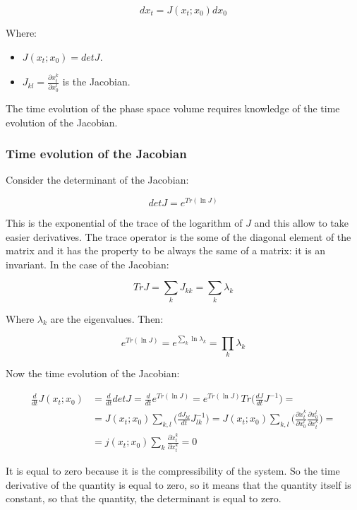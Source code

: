 	$$dx_t = J(x_t;x_0)dx_0$$

	Where:

	\begin{multicols}{2}
		\begin{itemize}
			\item $J(x_t;x_0) = det J$.
			\item $J_{kl} = \frac{\partial x_t^k}{\partial x_0^l}$ is the Jacobian.
		\end{itemize}
	\end{multicols}

	The time evolution of the phase space volume requires knowledge of the time evolution of the Jacobian.

		\subsubsection{Time evolution of the Jacobian}
		Consider the determinant of the Jacobian:

		$$det J = e^{Tr(\ln J)}$$

		This is the exponential of the trace of the logarithm of $J$ and this allow to take easier derivatives.
		The trace operator is the some of the diagonal element of the matrix and it has the property to be always the same of a matrix: it is an invariant.
		In the case of the Jacobian:

		$$Tr J = \sum\limits_k J_{kk} = \sum\limits_k\lambda_k$$

		Where $\lambda_k$ are the eigenvalues.
		Then:

		$$e^{Tr(\ln J)} = e^{\sum\limits_k\ln\lambda_k} = \prod\limits_k\lambda_k$$

		Now the time evolution of the Jacobian:

		\begin{align*}
			\frac{d}{dt}J(x_t;x_0) &= \frac{d}{dt} det J = \frac{d}{dt}e^{Tr(\ln J)} = e^{Tr(\ln J)}Tr\biggl(\frac{dJ}{dt}J^{-1}\biggr) = \\
														 &= J(x_t;x_0)\sum\limits_{k, l}\biggl(\frac{d J_{kl}}{dt}J_{lk}^{-1}\biggr) = J(x_t;x_0)\sum\limits_{k,l}\biggl(\frac{\partial\dot{x}_t^k}{\partial x_0^l}\frac{\partial x_0^l}{\partial x_t^k}\biggr) =\\
														 &=j(x_t;x_0)\sum\limits_k\frac{\partial\dot{x}_t^k}{\partial x_t^k} = 0
		\end{align*}

		It is equal to zero because it is the compressibility of the system.
		So the time derivative of the quantity is equal to zero, so it means that the quantity itself is constant, so that the quantity, the determinant is equal to zero.

